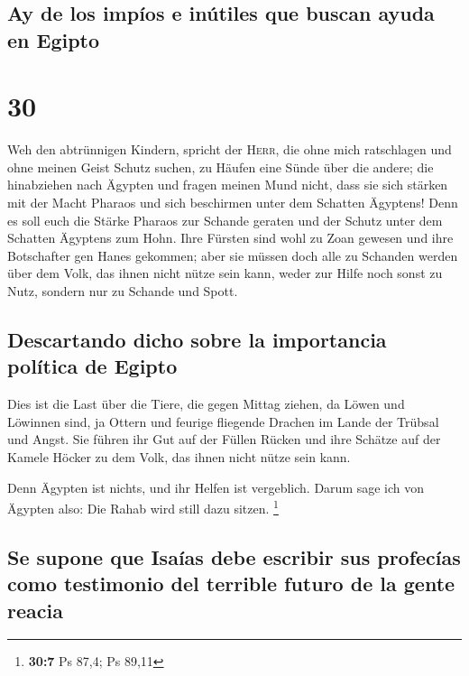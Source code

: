 \hypertarget{ay-de-los-impuxedos-e-inuxfatiles-que-buscan-ayuda-en-egipto}{%
\subsection{Ay de los impíos e inútiles que buscan ayuda en
Egipto}\label{ay-de-los-impuxedos-e-inuxfatiles-que-buscan-ayuda-en-egipto}}

\hypertarget{section-29}{%
\section{30}\label{section-29}}

 Weh den abtrünnigen Kindern, spricht der \textsc{Herr},
die ohne mich ratschlagen und ohne meinen Geist Schutz suchen, zu Häufen
eine Sünde über die andere;  die hinabziehen nach Ägypten
und fragen meinen Mund nicht, dass sie sich stärken mit der Macht
Pharaos und sich beschirmen unter dem Schatten Ägyptens! 
Denn es soll euch die Stärke Pharaos zur Schande geraten und der Schutz
unter dem Schatten Ägyptens zum Hohn.  Ihre Fürsten sind
wohl zu Zoan gewesen und ihre Botschafter gen Hanes gekommen;
 aber sie müssen doch alle zu Schanden werden über dem
Volk, das ihnen nicht nütze sein kann, weder zur Hilfe noch sonst zu
Nutz, sondern nur zu Schande und Spott.

\hypertarget{descartando-dicho-sobre-la-importancia-poluxedtica-de-egipto}{%
\subsection{Descartando dicho sobre la importancia política de
Egipto}\label{descartando-dicho-sobre-la-importancia-poluxedtica-de-egipto}}

 Dies ist die Last über die Tiere, die gegen Mittag
ziehen, da Löwen und Löwinnen sind, ja Ottern und feurige fliegende
Drachen im Lande der Trübsal und Angst. Sie führen ihr Gut auf der
Füllen Rücken und ihre Schätze auf der Kamele Höcker zu dem Volk, das
ihnen nicht nütze sein kann.

 Denn Ägypten ist nichts, und ihr Helfen ist vergeblich.
Darum sage ich von Ägypten also: Die Rahab wird still dazu sitzen.
\footnote{\textbf{30:7} Ps 87,4; Ps 89,11}

\hypertarget{se-supone-que-isauxedas-debe-escribir-sus-profecuxedas-como-testimonio-del-terrible-futuro-de-la-gente-reacia}{%
\subsection{Se supone que Isaías debe escribir sus profecías como
testimonio del terrible futuro de la gente
reacia}\label{se-supone-que-isauxedas-debe-escribir-sus-profecuxedas-como-testimonio-del-terrible-futuro-de-la-gente-reacia}}

